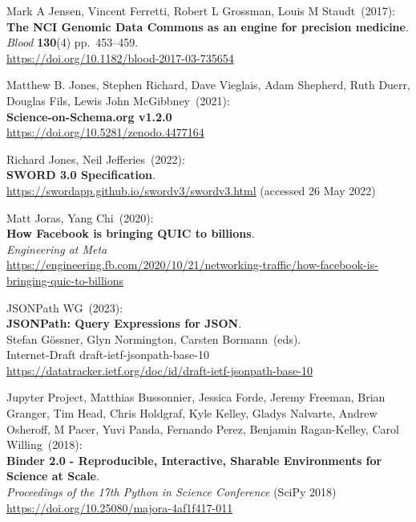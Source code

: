 \begin{thebibliography}{9}
Mark A Jensen, Vincent Ferretti, Robert L Grossman, Louis M Staudt~(2017): \\
\textbf{The NCI Genomic Data Commons as an engine for precision medicine}.\\
\emph{Blood} \textbf{130}(4) pp.~453--459.\\
\url{https://doi.org/10.1182/blood-2017-03-735654}

Matthew B. Jones, Stephen Richard, Dave Vieglais, Adam Shepherd, Ruth Duerr, Douglas Fils, Lewis John McGibbney~(2021): \\
\textbf{Science-on-Schema.org v1.2.0}\\
\url{https://doi.org/10.5281/zenodo.4477164}

Richard Jones, Neil Jefferies~(2022): \\
\textbf{SWORD 3.0 Specification}. \\
\url{https://swordapp.github.io/swordv3/swordv3.html} (accessed 26 May 2022)

Matt Joras, Yang Chi~(2020): \\
\textbf{How Facebook is bringing QUIC to billions}.\\
\emph{Engineering at Meta}\\
\url{https://engineering.fb.com/2020/10/21/networking-traffic/how-facebook-is-bringing-quic-to-billions}

JSONPath WG~(2023): \\
\textbf{JSONPath: Query Expressions for JSON}.\\
Stefan Gössner, Glyn Normington, Carsten Bormann~(eds).\\
Internet-Draft draft-ietf-jsonpath-base-10\\
\url{https://datatracker.ietf.org/doc/id/draft-ietf-jsonpath-base-10}

Jupyter Project, Matthias Bussonnier, Jessica Forde, Jeremy Freeman, Brian Granger, Tim Head, Chris Holdgraf, Kyle Kelley, Gladys Nalvarte, Andrew Osheroff, M Pacer, Yuvi Panda, Fernando Perez, Benjamin Ragan-Kelley, Carol Willing~(2018): \\
\textbf{Binder 2.0 - Reproducible, Interactive, Sharable Environments for Science at Scale}.\\
\emph{Proceedings of the 17th Python in Science Conference} (SciPy 2018)\\
\url{https://doi.org/10.25080/majora-4af1f417-011}


\end{thebibliography}
